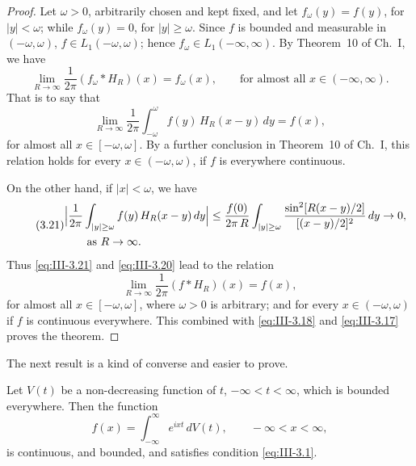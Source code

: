 \begin{proof}
Let $\omega>0$, arbitrarily chosen and kept fixed, and let $f_{\omega}(y)=f(y)$, for $|y|<\omega$; while $f_{\omega}(y)=0$, for $|y|\ge\omega$. Since $f$ is bounded and measurable in $(-\omega,\omega)$, $f\in L_{1}(-\omega,\omega)$; hence $f_{\omega}\in L_{1}(-\infty,\infty)$. By Theorem~10 of Ch.~I, we have
\[
\lim_{R\to\infty}\frac{1}{2\pi}(f_{\omega}*H_{R})(x)=f_{\omega}(x),\qquad\text{for almost all }x\in(-\infty,\infty).
\]
That is to say that
\begin{equation}\tag{3.20}\label{eq:III-3.20}
\lim_{R\to\infty}\frac{1}{2\pi}\int_{-\omega}^{\omega}f(y)\,H_{R}(x-y)\,dy=f(x),
\end{equation}
for almost all $x\in[-\omega,\omega]$. By a further conclusion in Theorem~10 of Ch.~I, this relation holds for every $x\in(-\omega,\omega)$, if $f$ is everywhere continuous.

On the other hand, if $|x|<\omega$, we have
\begin{equation}\tag{3.21}\label{eq:III-3.21}
\begin{aligned}
&\Bigl|\frac{1}{2\pi}\int_{|y|\ge\omega}f(y)\,H_{R}(x-y)\,dy\Bigr|
\le\frac{f(0)}{2\pi\,R}\int_{|y|\ge\omega}\frac{\sin^{2}[R(x-y)/2]}{[(x-y)/2]^{2}}\,dy\to0,\\
&\qquad\text{as }R\to\infty.
\end{aligned}
\end{equation}
Thus \eqref{eq:III-3.21} and \eqref{eq:III-3.20} lead to the relation
\begin{equation}\tag{3.19}\label{eq:III-3.19b}
\lim_{R\to\infty}\frac{1}{2\pi}(f*H_{R})(x)=f(x),
\end{equation}
for almost all $x\in[-\omega,\omega]$, where $\omega>0$ is arbitrary; and for every $x\in(-\omega,\omega)$ if $f$ is continuous everywhere. This combined with \eqref{eq:III-3.18} and \eqref{eq:III-3.17} proves the theorem.
\end{proof}

The next result is a kind of converse and easier to prove.

\begin{theorem}[Bochner]\label{thm:III-6}
Let $V(t)$ be a non-decreasing function of $t$, $-\infty<t<\infty$, which is bounded everywhere. Then the function
\begin{equation}\tag{3.22}\label{eq:III-3.22}
f(x)=\int_{-\infty}^{\infty}e^{ixt}\,dV(t),\qquad-\infty<x<\infty,
\end{equation}
is continuous, and bounded, and satisfies condition \eqref{eq:III-3.1}.
\end{theorem}

